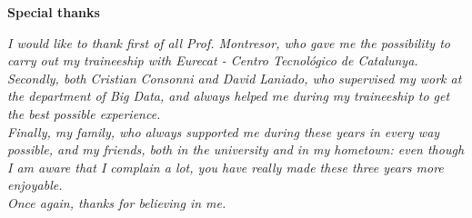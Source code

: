 \thispagestyle{empty}

\begin{center}
  {\bf \Huge Special thanks}
\end{center}

\vspace{4cm}


\emph{
  I would like to thank first of all Prof. Montresor, who gave me the possibility to carry out my traineeship with Eurecat - Centro Tecnológico de Catalunya.\\
  Secondly, both Cristian Consonni and David Laniado, who supervised my work at the department of Big Data, and always helped me during my traineeship to get the best possible experience.\\
  Finally, my family, who always supported me during these years in every way possible, and my friends, both in the university and in my hometown: even though I am aware that I complain a lot, you have really made these three years more enjoyable.\\
  Once again, thanks for believing in me.
}

